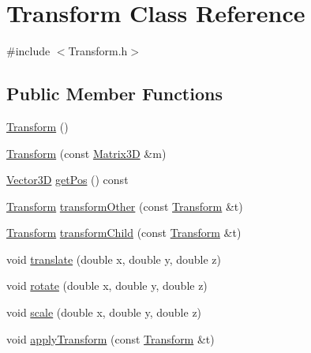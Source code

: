 \hypertarget{class_transform}{\section{Transform Class Reference}
\label{class_transform}
}


{\ttfamily \#include $<$Transform.\-h$>$}

\subsection*{Public Member Functions}
\begin{DoxyCompactItemize}
\item 
\hyperlink{class_transform_aa08ca4266efabc768973cdeea51945ab}{Transform} ()
\item 
\hyperlink{class_transform_a061a1a8e9dda0aaca268d2c5a86ba52e}{Transform} (const \hyperlink{class_matrix3_d}{Matrix3\-D} \&m)
\item 
\hyperlink{class_vector3_d}{Vector3\-D} \hyperlink{class_transform_a6bf31a150ad92d2526421081a301a668}{get\-Pos} () const 
\item 
\hyperlink{class_transform}{Transform} \hyperlink{class_transform_aeb37ee8512f05688c4aa6efbd36dd6b6}{transform\-Other} (const \hyperlink{class_transform}{Transform} \&t)
\item 
\hyperlink{class_transform}{Transform} \hyperlink{class_transform_a9c305c77f1dca3418b47dd1c1545a9fe}{transform\-Child} (const \hyperlink{class_transform}{Transform} \&t)
\item 
void \hyperlink{class_transform_a57a76ef2d274c5c8632e98fccca0f487}{translate} (double x, double y, double z)
\item 
void \hyperlink{class_transform_a2000fcffdb02984c2c5e51da4ff2afa0}{rotate} (double x, double y, double z)
\item 
void \hyperlink{class_transform_a9b3b1b60a8c4589d049e1e5fa62db4aa}{scale} (double x, double y, double z)
\item 
void \hyperlink{class_transform_acb521d818273c06fe88e306c8076e557}{apply\-Transform} (const \hyperlink{class_transform}{Transform} \&t)
\end{DoxyCompactItemize}


